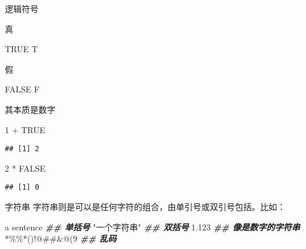 \documentclass[ignorenonframetext,]{beamer}
\newenvironment{Shaded}{\begin{snugshade}}{\end{snugshade}}
\newcommand{\ConstantTok}[1]{\textcolor[rgb]{0.00,0.00,0.00}{#1}}
\newcommand{\DecValTok}[1]{\textcolor[rgb]{0.00,0.00,0.81}{#1}}
\newcommand{\DocumentationTok}[1]{\textcolor[rgb]{0.56,0.35,0.01}{\textbf{\textit{#1}}}}
\newcommand{\NormalTok}[1]{#1}
\newcommand{\SpecialCharTok}[1]{\textcolor[rgb]{0.00,0.00,0.00}{#1}}
\newcommand{\StringTok}[1]{\textcolor[rgb]{0.31,0.60,0.02}{#1}}
\newcommand\FontSmall{\fontsize{7}{8}\selectfont}
\begin{document}
\begin{frame}[fragile]{逻辑符号}
\protect\hypertarget{ux903bux8f91ux7b26ux53f7}{}
\FontSmall

真

\begin{Shaded}
\begin{Highlighting}[]
\ConstantTok{TRUE}
\NormalTok{T}
\end{Highlighting}
\end{Shaded}

假

\begin{Shaded}
\begin{Highlighting}[]
\ConstantTok{FALSE}
\NormalTok{F}
\end{Highlighting}
\end{Shaded}

其本质是数字

\begin{Shaded}
\begin{Highlighting}[]
\DecValTok{1} \SpecialCharTok{+} \ConstantTok{TRUE}
\end{Highlighting}
\end{Shaded}

\begin{verbatim}
## [1] 2
\end{verbatim}

\begin{Shaded}
\begin{Highlighting}[]
\DecValTok{2} \SpecialCharTok{*} \ConstantTok{FALSE}
\end{Highlighting}
\end{Shaded}

\begin{verbatim}
## [1] 0
\end{verbatim}
\end{frame}

\begin{frame}[fragile]{字符串}
\protect\hypertarget{ux5b57ux7b26ux4e32}{}
字符串则是可以是任何字符的组合，由单引号或双引号包括。比如：

\FontSmall

\begin{Shaded}
\begin{Highlighting}[]
\StringTok{\textquotesingle{}a sentence\textquotesingle{}} \DocumentationTok{\#\# 单括号}
\StringTok{"一个字符串"} \DocumentationTok{\#\# 双括号}
\StringTok{\textquotesingle{}1.123\textquotesingle{}}      \DocumentationTok{\#\# 像是数字的字符串}
\StringTok{\textquotesingle{}*\%\%*()!@\#\#\&@(9\textquotesingle{}}  \DocumentationTok{\#\# 乱码}
\end{Highlighting}
\end{Shaded}
\end{frame}
\end{document}
